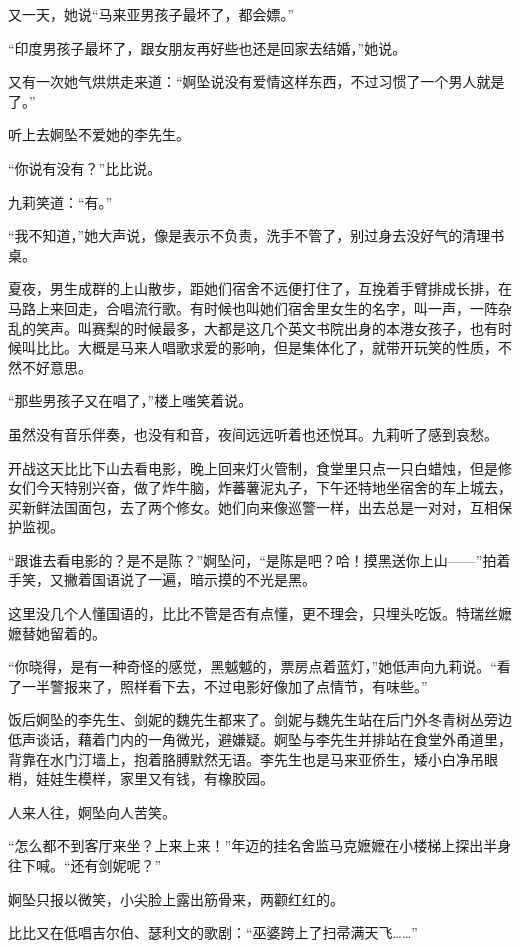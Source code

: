 \par 又一天，她说“马来亚男孩子最坏了，都会嫖。”
\par “印度男孩子最坏了，跟女朋友再好些也还是回家去结婚，”她说。
\par 又有一次她气烘烘走来道：“婀坠说没有爱情这样东西，不过习惯了一个男人就是了。”
\par 听上去婀坠不爱她的李先生。
\par “你说有没有？”比比说。
\par 九莉笑道：“有。”
\par “我不知道，”她大声说，像是表示不负责，洗手不管了，别过身去没好气的清理书桌。
\par 夏夜，男生成群的上山散步，距她们宿舍不远便打住了，互挽着手臂排成长排，在马路上来回走，合唱流行歌。有时候也叫她们宿舍里女生的名字，叫一声，一阵杂乱的笑声。叫赛梨的时候最多，大都是这几个英文书院出身的本港女孩子，也有时候叫比比。大概是马来人唱歌求爱的影响，但是集体化了，就带开玩笑的性质，不然不好意思。
\par “那些男孩子又在唱了，”楼上嗤笑着说。
\par 虽然没有音乐伴奏，也没有和音，夜间远远听着也还悦耳。九莉听了感到哀愁。
\par 开战这天比比下山去看电影，晚上回来灯火管制，食堂里只点一只白蜡烛，但是修女们今天特别兴奋，做了炸牛脑，炸蕃薯泥丸子，下午还特地坐宿舍的车上城去，买新鲜法国面包，去了两个修女。她们向来像巡警一样，出去总是一对对，互相保护监视。
\par “跟谁去看电影的？是不是陈？”婀坠问，“是陈是吧？哈！摸黑送你上山——”拍着手笑，又撇着国语说了一遍，暗示摸的不光是黑。
\par 这里没几个人懂国语的，比比不管是否有点懂，更不理会，只埋头吃饭。特瑞丝嬷嬷替她留着的。
\par “你晓得，是有一种奇怪的感觉，黑魆魆的，票房点着蓝灯，”她低声向九莉说。“看了一半警报来了，照样看下去，不过电影好像加了点情节，有味些。”
\par 饭后婀坠的李先生、剑妮的魏先生都来了。剑妮与魏先生站在后门外冬青树丛旁边低声谈话，藉着门内的一角微光，避嫌疑。婀坠与李先生并排站在食堂外甬道里，背靠在水门汀墙上，抱着胳膊默然无语。李先生也是马来亚侨生，矮小白净吊眼梢，娃娃生模样，家里又有钱，有橡胶园。
\par 人来人往，婀坠向人苦笑。
\par “怎么都不到客厅来坐？上来上来！”年迈的挂名舍监马克嬷嬷在小楼梯上探出半身往下喊。“还有剑妮呢？”
\par 婀坠只报以微笑，小尖脸上露出筋骨来，两颧红红的。
\par 比比又在低唱吉尔伯、瑟利文的歌剧：“巫婆跨上了扫帚满天飞……”
